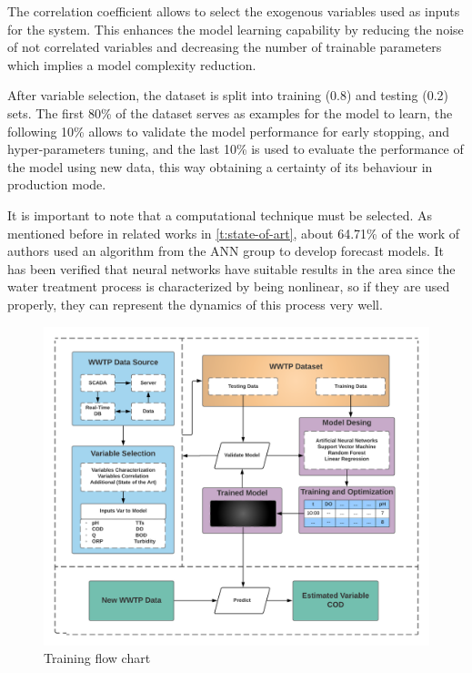  The correlation coefficient allows to select the exogenous variables used as inputs for the system. This enhances the model learning capability by reducing the noise of not correlated variables and decreasing the number of trainable parameters which implies a model complexity reduction. 

After variable selection, the dataset is split into training (0.8) and testing (0.2) sets. The first 80\% of the dataset serves as examples for the model to learn, the following 10\% allows to validate the model performance for early stopping, and hyper-parameters tuning, and the last 10\% is used to evaluate the performance of the model using new data, this way obtaining a certainty of its behaviour in production mode. 

It is important to note that a computational technique must be selected. As mentioned before in related works in \autoref{t:state-of-art}, about 64.71\% of the work of authors used an algorithm from the ANN group to develop forecast models. It has been verified that neural networks have suitable results in the area since the water treatment process is characterized by being nonlinear, so if they are used properly, they can represent the dynamics of this process very well. 

\begin{figure}[h]
\centering
\includegraphics[width=\linewidth]{figures/Ch4/training-FlowChart.png}
\caption{Training flow chart}
\label{f:training-flowchart}
\end{figure}

